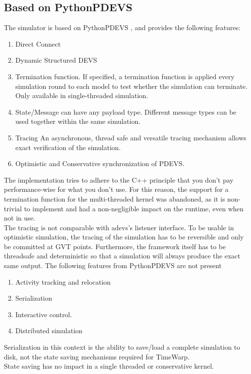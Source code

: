 \subsection{Based on PythonPDEVS}
The simulator is based on PythonPDEVS \cite{PythonPDEVS}  , and provides the following features: 
\begin{enumerate}
	\item Direct Connect \cite{SymbolicFlattening}
	\item Dynamic Structured DEVS
	\item Termination function. If specified, a termination function is applied every simulation round to each model to test whether the simulation can terminate. Only available in single-threaded simulation.
	\item State/Message can have any payload type. Different message types can be used together within the same simulation.
	\item Tracing An asynchronous, thread safe and versatile tracing mechanism allows exact verification of the simulation.
	\item Optimistic and Conservative synchronization of PDEVS.
\end{enumerate}
The implementation tries to adhere to the C++ principle that you don't pay performance-wise for what you don't use. For this reason, the support for a termination function for the multi-threaded kernel was abandoned, as it is non-trivial to implement and had a non-negligible impact on the runtime, even when not in use.\\
The tracing is not comparable with adevs's listener interface. To be usable in optimistic simulation, the tracing of the simulation has to be reversible and only be committed at GVT points. Furthermore, the framework itself has to be threadsafe and deterministic so that a simulation will always produce the exact same output.
The following features from PythonPDEVS are not present
\begin{enumerate}
	\item Activity tracking and relocation
	\item Serialization
	\item Interactive control. 
	\item Distributed simulation
\end{enumerate}
Serialization in this context is the ability to save/load a complete simulation to disk, not the state saving mechanisms required for TimeWarp.\\ State saving has no impact in a single threaded or conservative kernel.\\
